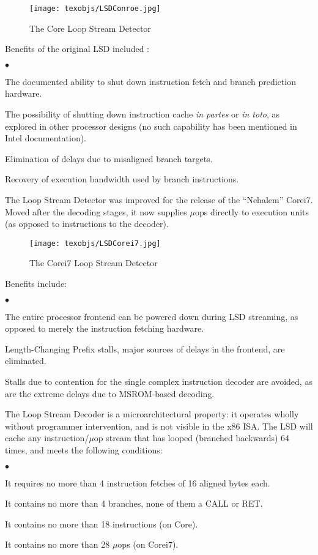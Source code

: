 \documentclass[]{sigplanconf}
\newcommand{\squishlist}{\begin{list}{$\bullet$}
  {\setlength{\itemsep}{0pt}
    \setlength{\parsep}{3pt}
    \setlength{\topsep}{3pt}
    \setlength{\partopsep}{0pt}
    \setlength{\leftmargin}{1.5em}
    \setlength{\labelwidth}{1em}
    \setlength{\labelsep}{0.5em}}}
\newcommand{\squishend}{\end{list}}
\begin{document}
\begin{figure}
\texttt{[image: texobjs/LSDConroe.jpg]}
\caption{The Core Loop Stream Detector}
\label{fig:lsdcorei7}
\end{figure}

Benefits of the original LSD included \cite{inteloptimize}:
\squishlist
\item The documented ability to shut down instruction fetch and branch prediction hardware.
\item The possibility of shutting down instruction cache \textit{in partes} or
\textit{in toto}, as explored in other processor designs \cite{badulescu} (no
such capability has been mentioned in Intel documentation).
\item Elimination of delays due to misaligned branch targets.
\item Recovery of execution bandwidth used by branch instructions.
\squishend

The Loop Stream Detector was improved for the release of the ``Nehalem''
Core\texttrademark i7. Moved after the decoding stages, it now supplies $\mu$ops directly
to execution units (as opposed to instructions to the decoder).

\begin{figure}[h]
\texttt{[image: texobjs/LSDCorei7.jpg]}
\caption{The Core\texttrademark  i7 Loop Stream Detector}
\label{fig:lsdcorei7}
\end{figure}

Benefits include:
\squishlist
\item The entire processor frontend can be powered down during LSD streaming,
as opposed to merely the instruction fetching hardware.
\item Length-Changing Prefix stalls, major sources of delays in the frontend,
are eliminated.
\item Stalls due to contention for the single complex instruction decoder are
avoided, as are the extreme delays due to MSROM-based decoding.
\squishend

The Loop Stream Decoder is a microarchitectural property: it operates wholly
without programmer intervention, and is not visible in the x86 ISA. The LSD
will cache any instruction/$\mu$op stream that has looped (branched backwards)
64 times, and meets the following conditions:
\squishlist
\item It requires no more than 4 instruction fetches of 16 aligned
bytes each.
\item It contains no more than 4 branches, none of them a CALL or RET.
\item It contains no more than 18 instructions (on Core).
\item It contains no more than 28 $\mu$ops (on Core\texttrademark i7).
\squishend
\end{document}

